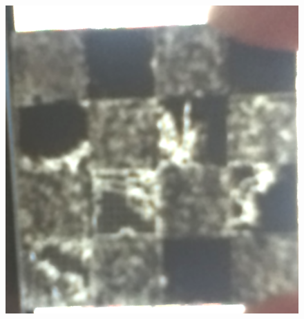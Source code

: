 \documentclass[annual]{acmsiggraph}
\begin{document}
{\begin{subfigure}[b]{0.2\textwidth}
                \caption{}
                \label{teaser:ours}
        \end{subfigure}
        ~
        \begin{subfigure}[b]{0.2\textwidth}
                \centering
    	\includegraphics[width=\textwidth]{figure/chess.png}
                \caption{}
                \label{teaser:makerbot}
        \end{subfigure}
        ~
        \begin{subfigure}[b]{0.2\textwidth}
                \centering

\end{subfigure}}
\end{document}
